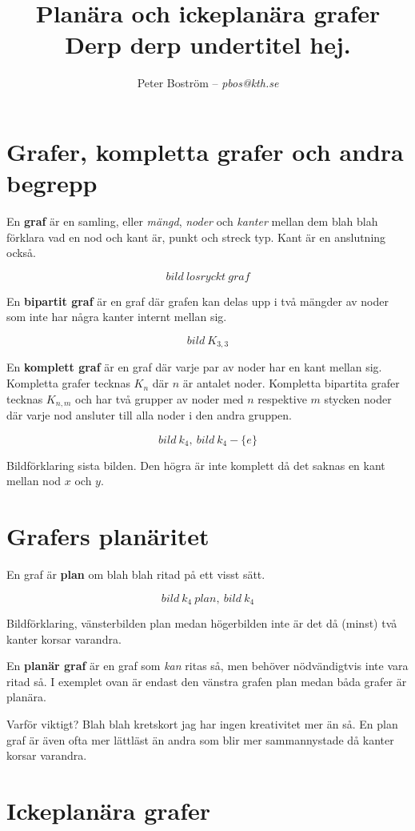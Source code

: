 \documentclass[a4paper,11pt]{article}
\title{Planära och ickeplanära grafer\\\vspace{4pt}\normalsize Derp derp undertitel hej.}
\author{Peter Boström -- \emph{pbos@kth.se}}
\begin{document}
\maketitle
\pagestyle{fancyplain}

\section*{Grafer, kompletta grafer och andra begrepp}

En \textbf{graf} är en samling, eller \emph{mängd}, \emph{noder} och \emph{kanter} mellan dem blah blah förklara vad en nod och kant är, punkt och streck typ. Kant är en anslutning också.

$$bild\ losryckt\ graf$$

En \textbf{bipartit graf} är en graf där grafen kan delas upp i två mängder av noder som inte har några kanter internt mellan sig.

$$bild\ K_{3,3}$$

En \textbf{komplett graf} är en graf där varje par av noder har en kant mellan sig. Kompletta grafer tecknas $K_n$ där $n$ är antalet noder. Kompletta bipartita grafer tecknas $K_{n,m}$ och har två grupper av noder med $n$ respektive $m$ stycken noder där varje nod ansluter till alla noder i den andra gruppen.

$$bild\ k_4,\ bild\ k_4-\{e\}$$

Bildförklaring sista bilden. Den högra är inte komplett då det saknas en kant mellan nod $x$ och $y$.

\section*{Grafers planäritet}

En graf är \textbf{plan} om blah blah ritad på ett visst sätt.

$$bild\ k_4\ plan,\ bild\ k_4$$

Bildförklaring, vänsterbilden plan medan högerbilden inte är det då (minst) två kanter korsar varandra.

En \textbf{planär graf} är en graf som \emph{kan} ritas så, men behöver nödvändigtvis inte vara ritad så. I exemplet ovan är endast den vänstra grafen plan medan båda grafer är planära.

Varför viktigt? Blah blah kretskort jag har ingen kreativitet mer än så. En plan graf är även ofta mer lättläst än andra som blir mer sammannystade då kanter korsar varandra.

\section*{Ickeplanära grafer}
\end{document}
